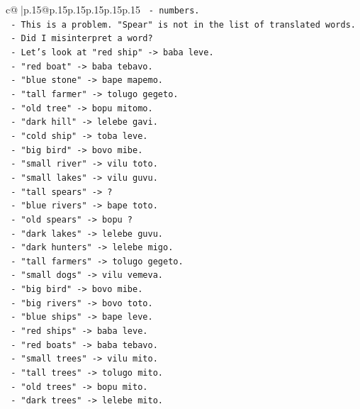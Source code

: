 \documentclass{article}
\begin{document}
{\begin{supertabular}{c@{$\;$}|p{.15\linewidth}@{}p{.15\linewidth}p{.15\linewidth}p{.15\linewidth}p{.15\linewidth}p{.15\linewidth}}
{{{\texttt{      {-} numbers.} \\
\texttt{    {-} This is a problem. "Spear" is not in the list of translated words.} \\
\texttt{    {-} Did I misinterpret a word?} \\
\texttt{    {-} Let's look at "red ship" {-}> baba leve.} \\
\texttt{    {-} "red boat" {-}> baba tebavo.} \\
\texttt{    {-} "blue stone" {-}> bape mapemo.} \\
\texttt{    {-} "tall farmer" {-}> tolugo gegeto.} \\
\texttt{    {-} "old tree" {-}> bopu mitomo.} \\
\texttt{    {-} "dark hill" {-}> lelebe gavi.} \\
\texttt{    {-} "cold ship" {-}> toba leve.} \\
\texttt{    {-} "big bird" {-}> bovo mibe.} \\
\texttt{    {-} "small river" {-}> vilu toto.} \\
\texttt{    {-} "small lakes" {-}> vilu guvu.} \\
\texttt{    {-} "tall spears" {-}> ?} \\
\texttt{    {-} "blue rivers" {-}> bape toto.} \\
\texttt{    {-} "old spears" {-}> bopu ?} \\
\texttt{    {-} "dark lakes" {-}> lelebe guvu.} \\
\texttt{    {-} "dark hunters" {-}> lelebe migo.} \\
\texttt{    {-} "tall farmers" {-}> tolugo gegeto.} \\
\texttt{    {-} "small dogs" {-}> vilu vemeva.} \\
\texttt{    {-} "big bird" {-}> bovo mibe.} \\
\texttt{    {-} "big rivers" {-}> bovo toto.} \\
\texttt{    {-} "blue ships" {-}> bape leve.} \\
\texttt{    {-} "red ships" {-}> baba leve.} \\
\texttt{    {-} "red boats" {-}> baba tebavo.} \\
\texttt{    {-} "small trees" {-}> vilu mito.} \\
\texttt{    {-} "tall trees" {-}> tolugo mito.} \\
\texttt{    {-} "old trees" {-}> bopu mito.} \\
\texttt{    {-} "dark trees" {-}> lelebe mito.} \\
}}}
\end{supertabular}}
\end{document}
